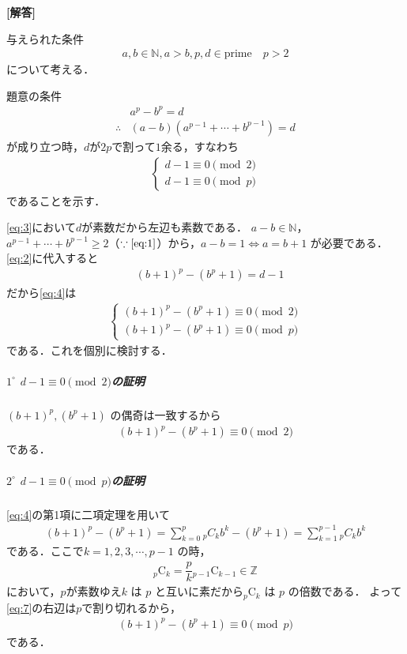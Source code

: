 \documentclass[../../main.tex]{subfiles}
\begin{document}
\begin{oframed}
  
\end{oframed}

{\bf [解答]}

与えられた条件
\begin{align}
  a, b \in \mathbb{N}, a > b, p, d \in \text{prime} \quad p > 2 \label{eq:1}
\end{align}
について考える．

題意の条件
\begin{align}
  & a^p - b^p = d \label{eq:2}\\
  \therefore
  & (a - b)(a^{p-1} + \cdots + b^{p-1}) = d \label{eq:3}
\end{align}
が成り立つ時，$d$が$2p$で割って$1$余る，すなわち
\begin{align}
  \begin{cases}
    d - 1 \equiv 0 \pmod 2 \\
    d - 1 \equiv 0 \pmod p
  \end{cases} \label{eq:4}
\end{align}
であることを示す．

\cref{eq:3}において$d$が素数だから左辺も素数である．
$a - b \in \mathbb{N}$，$a^{p-1} + \cdots + b^{p-1} \ge 2$（$\because \text{\cref{eq:1}}$）から，$a - b = 1 \iff a = b + 1$ が必要である．\cref{eq:2}に代入すると
\begin{align}
  & (b+1)^p - (b^p+1) = d - 1
\end{align}
だから\cref{eq:4}は
\begin{align}
  \begin{cases}
    (b+1)^p - (b^p+1) \equiv 0 \pmod 2 \\
    (b+1)^p - (b^p+1) \equiv 0 \pmod p
  \end{cases} \label{eq:5}
\end{align}
である．これを個別に検討する．

\subparagraph{$1^\circ$ $d-1 \equiv 0 \pmod 2$の証明}

$(b+1)^p, (b^p+1)$ の偶奇は一致するから
\begin{align}
  (b+1)^p - (b^p+1) \equiv 0 \pmod 2 \label{eq:6}
\end{align}
である．

\subparagraph{$2^\circ$ $d-1 \equiv 0 \pmod p$の証明}

\cref{eq:4}の第1項に二項定理を用いて
\begin{align}
  (b+1)^p - (b^p+1) = \sum_{k=0}^{p}{}_pC_{k}b^k - (b^p+1) = \sum_{k=1}^{p-1}{}_pC_{k}b^k \label{eq:7}
\end{align}
である．ここで$k = 1, 2, 3, \cdots, p-1$ の時，
\begin{align}
  {}_p\mathrm{C}_k = \dfrac{p}{k} {}_{p-1}\mathrm{C}_{k-1} \in \mathbb{Z}
\end{align}
において，$p$が素数ゆえ$k$ は $p$ と互いに素だから${}_p\mathrm{C}_k$ は $p$ の倍数である．
よって\cref{eq:7}の右辺は$p$で割り切れるから，
\begin{align}
  (b+1)^p - (b^p+1) \equiv 0 \pmod p \label{eq:8}
\end{align}
である．
\casesend
\end{document}
